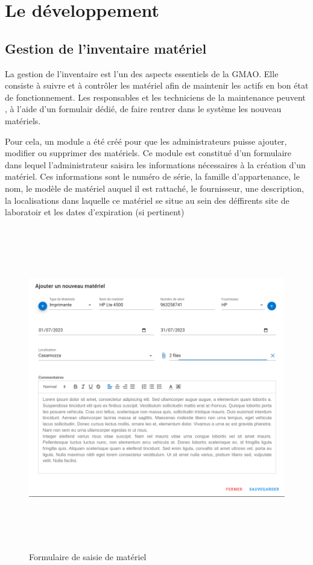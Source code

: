 \section{Le développement}
\subsection{Gestion de l’inventaire matériel}
La gestion de l'inventaire est l'un des aspects essentiels de la GMAO. 
Elle consiste à suivre et à contrôler les matériel afin de maintenir les 
actifs en bon état de fonctionnement. Les responsables et les techniciens de la maintenance peuvent ,
à l'aide d'un formulair dédié, de faire rentrer dans le système les nouveau matériels.

Pour cela, un module a été créé pour que 
les administrateurs puisse ajouter, modifier ou supprimer des matériels. 
Ce module est constitué d’un formulaire dans lequel l’administrateur 
saisira les informations nécessaires à la création d’un matériel. 
Ces informations sont le numéro de série, la famille d’appartenance, le nom, 
le modèle de matériel auquel il est rattaché, le fournisseur, une description, la localisations
dans laquelle ce matériel se situe au sein des déffirents site de laboratoir et 
les dates d'expiration (si pertinent)
\begin{figure}[hp]
    \centering
    \includegraphics[width=400pt, height=400pt]{images/inventaire.png}
    \caption{Formulaire de saisie de matériel}
\end{figure}


